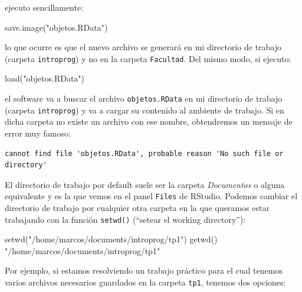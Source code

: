 \documentclass[
]{book}
\newenvironment{Shaded}{\begin{snugshade}}{\end{snugshade}}
\newcommand{\FunctionTok}[1]{\textcolor[rgb]{0.00,0.00,0.00}{#1}}
\newcommand{\NormalTok}[1]{#1}
\newcommand{\StringTok}[1]{\textcolor[rgb]{0.31,0.60,0.02}{#1}}
\begin{document}
ejecuto sencillamente:

\begin{Shaded}
\begin{Highlighting}[]
\FunctionTok{save.image}\NormalTok{(}\StringTok{"objetos.RData"}\NormalTok{)}
\end{Highlighting}
\end{Shaded}

lo que ocurre es que el nuevo archivo se generará en mi directorio de trabajo (carpeta \texttt{introprog}) y no en la carpeta \texttt{Facultad}. Del mismo modo, si ejecuto:

\begin{Shaded}
\begin{Highlighting}[]
\FunctionTok{load}\NormalTok{(}\StringTok{"objetos.RData"}\NormalTok{)}
\end{Highlighting}
\end{Shaded}

el software va a buscar el archivo \texttt{objetos.RData} en mi directorio de trabajo (carpeta \texttt{introprog}) y va a cargar su contenido al ambiente de trabajo. Si en dicha carpeta no existe un archivo con ese nombre, obtendremos un mensaje de error muy famoso:

\begin{verbatim}
cannot find file 'objetos.RData', probable reason 'No such file or directory'
\end{verbatim}

El directorio de trabajo por default suele ser la carpeta \emph{Documentos} o alguna equivalente y es la que vemos en el panel \texttt{Files} de RStudio. Podemos cambiar el directorio de trabajo por cualquier otra carpeta en la que queramos estar trabajando con la función \texttt{setwd()} (``setear el working directory''):

\begin{Shaded}
\begin{Highlighting}[]
\FunctionTok{setwd}\NormalTok{(}\StringTok{"/home/marcos/documents/introprog/tp1"}\NormalTok{)}
\FunctionTok{getwd}\NormalTok{()}
\StringTok{"/home/marcos/documents/introprog/tp1"}
\end{Highlighting}
\end{Shaded}

Por ejemplo, si estamos resolviendo un trabajo práctico para el cual tenemos varios archivos necesarios guardados en la carpeta \texttt{tp1}, tenemos dos opciones:
\end{document}

